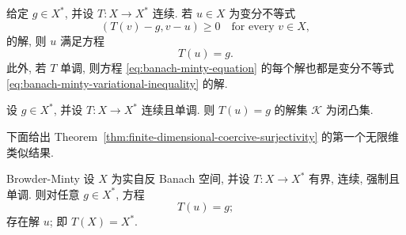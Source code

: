 \begin{Lemma}
\label{lem:banach-minty-equivalence}
给定 $g\in X^*$, 并设 $T:X\to X^*$ 连续. 若 $u\in X$ 为变分不等式
\begin{equation}\label{eq:banach-minty-variational-inequality}
(T(v)-g,v-u)\geq0\quad\text{for every }v\in X,
\end{equation}
的解, 则 $u$ 满足方程
\begin{equation}\label{eq:banach-minty-equation}
T(u)=g.
\end{equation}
此外, 若 $T$ 单调, 则方程 \eqref{eq:banach-minty-equation} 的每个解也都是变分不等式 \eqref{eq:banach-minty-variational-inequality} 的解.
\end{Lemma}

\begin{Theorem}
\label{thm:banach-monotone-solution-set-closed-convex}
设 $g\in X^*$, 并设 $T:X\to X^*$ 连续且单调. 则 $T(u)=g$ 的解集 $\mathcal{K}$ 为闭凸集.
\end{Theorem}

下面给出 Theorem~\ref{thm:finite-dimensional-coercive-surjectivity} 的第一个无限维类似结果.

\begin{Theorem}{Browder-Minty}
\label{thm:browder-minty-surjectivity}
设 $X$ 为实自反 Banach 空间, 并设 $T:X\to X^*$ 有界, 连续, 强制且单调. 则对任意 $g\in X^*$, 方程
\begin{equation}\label{eq:browder-minty-surjectivity-equation}
T(u)=g;
\end{equation}
存在解 $u$; 即 $T(X)=X^*$.
\end{Theorem}

